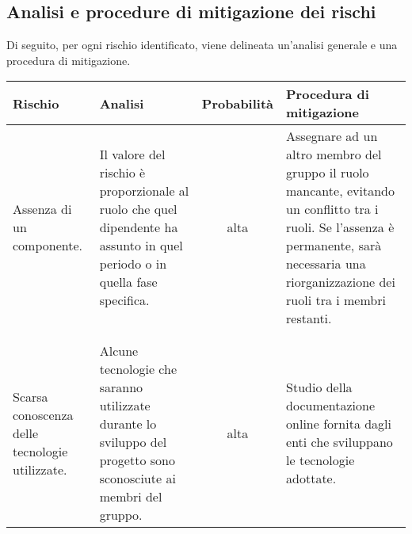 {	\newpage
	\subsection{Analisi e procedure di mitigazione dei rischi}{
	\label{cap:AnalisiRischi}
	Di seguito, per ogni rischio identificato, viene delineata un'analisi generale e una procedura di mitigazione.
		
	\begin{table}[h!]
	\scriptsize
		\begin{center}
				\begin{minipage}{1\linewidth}
					\begin{tabular}{l l c l}				
					\toprule
					Rischio&	 Analisi	& Probabilità & Procedura di mitigazione \\ 
					\midrule
					\begin{minipage}{0.2\linewidth}
					Assenza di un \newline componente.
					\end{minipage}
					&
					\begin{minipage}{0.3\linewidth}
					Il valore del rischio è proporzionale al ruolo che quel dipendente ha assunto in quel periodo o in quella fase specifica.
					\end{minipage}				
					 & 
					 alta
					 &
					 \begin{minipage}{0.3\linewidth}
					 Assegnare ad un altro membro del gruppo il ruolo mancante, evitando un conflitto tra i ruoli. Se l'assenza è permanente, sarà necessaria una riorganizzazione dei ruoli tra i membri restanti.
					\end{minipage}
					\\
					\\
					\bottomrule
					\\
					\begin{minipage}{0.2\linewidth}
					Scarsa conoscenza \newline delle \newline tecnologie utilizzate.
					\end{minipage}										
					 &
					\begin{minipage}{0.3\linewidth}
					Alcune tecnologie che saranno utilizzate durante lo sviluppo del progetto sono sconosciute ai membri del gruppo.
					\end{minipage}
					& 
					alta
					&
					\begin{minipage}{0.3\linewidth}
					Studio della documentazione online fornita dagli enti che sviluppano le tecnologie adottate.

\end{minipage}
\end{tabular}
\end{minipage}
\end{center}
\end{table}}}
